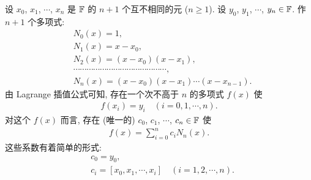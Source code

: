 \begin{proposition}
    设 $x_0$, $x_1$, $\cdots$, $x_{n}$ 是 $\mathbb{F}$ 的 $n+1$ 个互不相同的元 ($n \geq 1$). 设 $y_0$, $y_1$, $\cdots$, $y_{n} \in \mathbb{F}$. 作 $n+1$ 个多项式:
    \begin{align*}
         & N_0 (x) = 1,                                          \\
         & N_1 (x) = x - x_0,                                    \\
         & N_2 (x) = (x - x_0) (x - x_1),                        \\
         & \cdots \cdots \cdots \cdots \cdots \cdots \cdots
        \cdots \cdots \cdots \cdots \cdots \cdots \cdots,        \\
         & N_{n} (x) = (x - x_0) (x - x_1) \cdots (x - x_{n-1}).
    \end{align*}
    由 Lagrange 插值公式可知, 存在一个次不高于 $n$ 的多项式 $f(x)$ 使
    \begin{align*}
        f(x_i) = y_i \quad (i = 0,1,\cdots,n).
    \end{align*}
    对这个 $f(x)$ 而言, 存在 (唯一的) $c_0$, $c_1$, $\cdots$, $c_n \in \mathbb{F}$ 使
    \begin{align*}
        f(x) = \sum_{i = 0}^{n} c_i N_{n} (x).
    \end{align*}
    这些系数有着简单的形式:
    \begin{align*}
         & c_0 = y_0,                                              \\
         & c_i = [x_0, x_1, \cdots, x_i] \quad (i = 1,2,\cdots,n).
    \end{align*}
\end{proposition}

